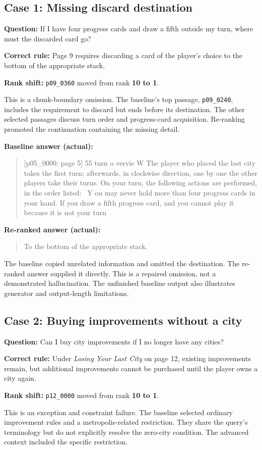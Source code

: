 \documentclass[10pt,a4paper]{article}
\newcommand{\answer}[1]{\begin{quote}\small #1\end{quote}}
\begin{document}
\subsection{Case 1: Missing discard destination}
\textbf{Question:} If I have four progress cards and draw a fifth outside my turn, where must the discarded card go?

\textbf{Correct rule:} Page 9 requires discarding a card of the player's choice to the bottom of the appropriate stack.

\textbf{Rank shift:} \texttt{p09\_0360} moved from rank \textbf{10 to 1}.

This is a chunk-boundary omission. The baseline's top passage, \texttt{p09\_0240}, includes the requirement to discard but ends before its destination. The other selected passages discuss turn order and progress-card acquisition. Re-ranking promoted the continuation containing the missing detail.

\textbf{Baseline answer (actual):}
\answer{[p05\_0000; page 5] 55 turn o vervie W The player who placed the last city takes the first turn; afterwards, in clockwise direction, one by one the other players take their turns. On your turn, the following actions are performed, in the order listed: \textbullet\ Y ou may never hold more than four progress cards in your hand. If you draw a fifth progress card, and you cannot play it because it is not your turn}

\textbf{Re-ranked answer (actual):}
\answer{To the bottom of the appropriate stack.}

The baseline copied unrelated information and omitted the destination. The re-ranked answer supplied it directly. This is a repaired omission, not a demonstrated hallucination. The unfinished baseline output also illustrates generator and output-length limitations.

\subsection{Case 2: Buying improvements without a city}
\textbf{Question:} Can I buy city improvements if I no longer have any cities?

\textbf{Correct rule:} Under \emph{Losing Your Last City} on page 12, existing improvements remain, but additional improvements cannot be purchased until the player owns a city again.

\textbf{Rank shift:} \texttt{p12\_0000} moved from rank \textbf{10 to 1}.

This is an exception and constraint failure. The baseline selected ordinary improvement rules and a metropolis-related restriction. They share the query's terminology but do not explicitly resolve the zero-city condition. The advanced context included the specific restriction.
\end{document}
